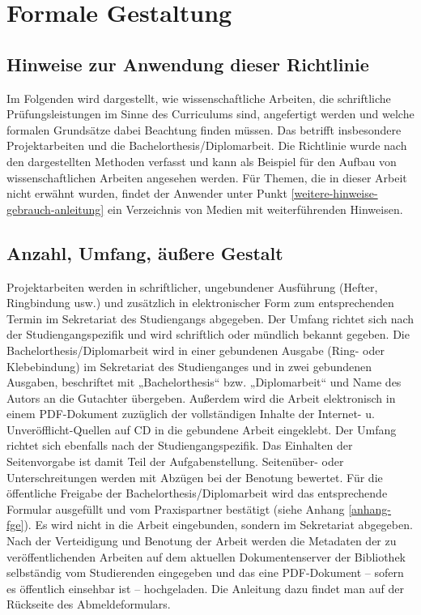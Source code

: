 \chapter{Formale Gestaltung}
\label{formal}
\section{Hinweise zur Anwendung dieser Richtlinie}
\label{formal-hinweise}
Im Folgenden wird dargestellt, wie wissenschaftliche Arbeiten, die schriftliche Prüfungsleistungen im Sinne des Curriculums sind, angefertigt werden und welche formalen Grundsätze dabei Beachtung finden müssen.
Das betrifft insbesondere Projektarbeiten und die Bachelorthesis/Diplomarbeit.
Die Richtlinie wurde nach den dargestellten Methoden verfasst und kann als Beispiel für den Aufbau von wissenschaftlichen Arbeiten angesehen werden.
Für Themen, die in dieser Arbeit nicht erwähnt wurden, findet der Anwender unter Punkt \ref{weitere-hinweise-gebrauch-anleitung} ein Verzeichnis von Medien mit weiterführenden Hinweisen.
\section{Anzahl, Umfang, äußere Gestalt}
\label{formal-anzahl-umfang-gestalt}
Projektarbeiten werden in schriftlicher, ungebundener Ausführung (Hefter, Ringbindung usw.) und zusätzlich in elektronischer Form zum entsprechenden Termin im Sekretariat des Studiengangs abgegeben.
Der Umfang richtet sich nach der Studiengangspezifik und wird schriftlich oder mündlich bekannt gegeben.
Die Bachelorthesis/Diplomarbeit wird in einer gebundenen Ausgabe (Ring- oder Klebebindung) im Sekretariat des Studienganges und in zwei gebundenen Ausgaben, beschriftet mit „Bachelorthesis“ bzw. „Diplomarbeit“ und Name des Autors an die Gutachter übergeben.
Außerdem wird die Arbeit elektronisch in einem \ac{PDF}-Dokument zuzüglich der vollständigen Inhalte der Internet- u. Unveröfflicht-Quellen auf \ac{CD} in die gebundene Arbeit eingeklebt.
Der Umfang richtet sich ebenfalls nach der Studiengangspezifik.
Das Einhalten der Seitenvorgabe ist damit Teil der Aufgabenstellung.
Seitenüber- oder Unterschreitungen werden mit Abzügen bei der Benotung bewertet.
Für die öffentliche Freigabe der Bachelorthesis/Diplomarbeit wird das entsprechende Formular ausgefüllt und vom Praxispartner bestätigt (siehe Anhang \ref{anhang-fge}).
Es wird nicht in die Arbeit eingebunden, sondern im Sekretariat abgegeben.
Nach der Verteidigung und Benotung der Arbeit werden die Metadaten der zu veröffentlichenden Arbeiten auf dem aktuellen Dokumentenserver der Bibliothek selbständig vom Studierenden eingegeben und das eine \ac{PDF}-Dokument – sofern es öffentlich einsehbar ist – hochgeladen.
Die Anleitung dazu findet man auf der Rückseite des Abmeldeformulars.

